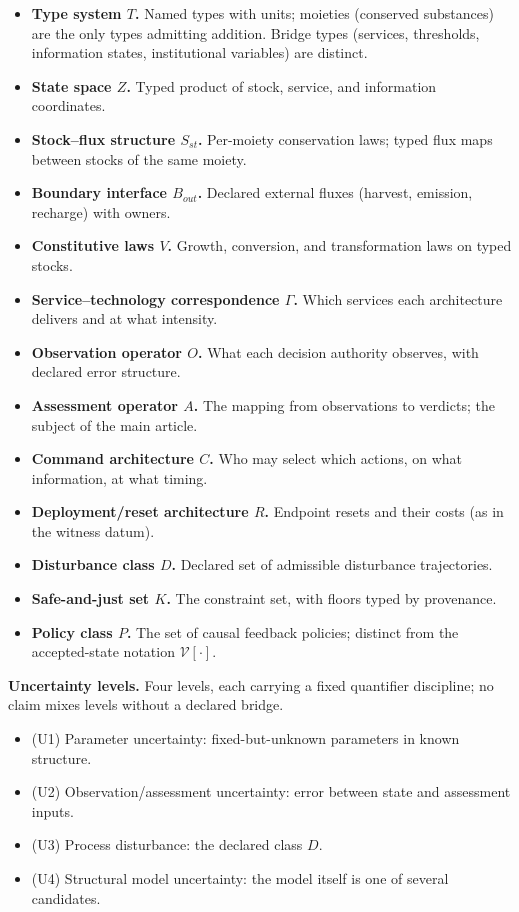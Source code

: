 \begin{itemize}[leftmargin=2em]
\item \textbf{Type system $T$.} Named types with units; moieties (conserved substances) are the only types admitting addition. Bridge types (services, thresholds, information states, institutional variables) are distinct.
\item \textbf{State space $Z$.} Typed product of stock, service, and information coordinates.
\item \textbf{Stock--flux structure $S_{st}$.} Per-moiety conservation laws; typed flux maps between stocks of the same moiety.
\item \textbf{Boundary interface $B_{out}$.} Declared external fluxes (harvest, emission, recharge) with owners.
\item \textbf{Constitutive laws $V$.} Growth, conversion, and transformation laws on typed stocks.
\item \textbf{Service--technology correspondence $\Gamma$.} Which services each architecture delivers and at what intensity.
\item \textbf{Observation operator $O$.} What each decision authority observes, with declared error structure.
\item \textbf{Assessment operator $A$.} The mapping from observations to verdicts; the subject of the main article.
\item \textbf{Command architecture $C$.} Who may select which actions, on what information, at what timing.
\item \textbf{Deployment/reset architecture $R$.} Endpoint resets and their costs (as in the witness datum).
\item \textbf{Disturbance class $D$.} Declared set of admissible disturbance trajectories.
\item \textbf{Safe-and-just set $K$.} The constraint set, with floors typed by provenance.
\item \textbf{Policy class $P$.} The set of causal feedback policies; distinct from the accepted-state notation $\mathcal{V}[\cdot]$.
\end{itemize}

\textbf{Uncertainty levels.} Four levels, each carrying a fixed quantifier discipline; no claim mixes levels without a declared bridge.

\begin{itemize}[leftmargin=2em]
\item (U1) Parameter uncertainty: fixed-but-unknown parameters in known structure.
\item (U2) Observation/assessment uncertainty: error between state and assessment inputs.
\item (U3) Process disturbance: the declared class $D$.
\item (U4) Structural model uncertainty: the model itself is one of several candidates.
\end{itemize}

